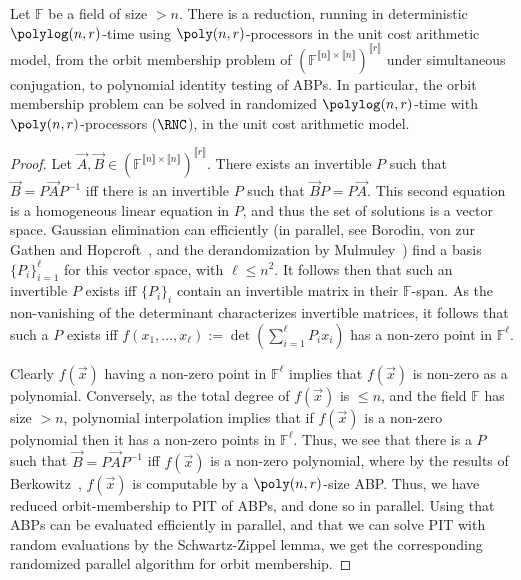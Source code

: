 \documentclass[letterpaper,11pt]{article}
\numberwithin{equation}{section}
\theoremstyle{plain}
\theoremstyle{remark}
\newcommand{\zr}[1]{{\llbracket {#1}\rrbracket}}
\newcommand{\F}{\mathbb{F}}
\newcommand{\eqdef}{:=}
\begin{document}
\begin{theorem}
	\label{orbitmembership}
	Let $\F$ be a field of size $>n$. There is a reduction, running in deterministic $\polylog(n,r)$-time using $\poly(n,r)$-processors in the unit cost arithmetic model, from the orbit membership problem of $(\F^{\zr{n}\times \zr{n}})^{\zr{r}}$ under simultaneous conjugation, to polynomial identity testing of ABPs.  In particular, the orbit membership problem can be solved in randomized $\polylog(n,r)$-time with $\poly(n,r)$-processors ($\RNC$), in the unit cost arithmetic model.
\end{theorem}
\begin{proof}
	Let $\vec{A},\vec{B}\in(\F^{\zr{n}\times\zr{n}})^{\zr{r}}$. There exists an invertible $P$ such that $\vec{B}=P\vec{A}P^{-1}$ iff there is an invertible $P$ such that $\vec{B}P=P\vec{A}$.  This second equation is a homogeneous linear equation in $P$, and thus the set of solutions is a vector space. Gaussian elimination can efficiently (in parallel, see Borodin, von zur Gathen and Hopcroft~\cite{BorodinGH82}, and the derandomization by Mulmuley~\cite{Mulmuley87}) find a basis $\{P_i\}_{i=1}^\ell$ for this vector space, with $\ell\le n^2$.  It follows then that such an invertible $P$ exists iff $\{P_i\}_i$ contain an invertible matrix in their $\F$-span.  As the non-vanishing of the determinant characterizes invertible matrices, it follows that such a $P$ exists iff $f(x_1,\ldots,x_\ell)\eqdef\det(\sum_{i=1}^\ell P_i x_i)$ has a non-zero point in $\F^\ell$.

	Clearly $f(\vec{x})$ having a non-zero point in $\F^\ell$ implies that $f(\vec{x})$ is non-zero as a polynomial. Conversely, as the total degree of $f(\vec{x})$ is $\le n$, and the field $\F$ has size $>n$, polynomial interpolation implies that if $f(\vec{x})$ is a non-zero polynomial then it has a non-zero points in $\F^\ell$. Thus, we see that there is a $P$ such that $\vec{B}=P\vec{A}P^{-1}$ iff $f(\vec{x})$ is a non-zero polynomial, where by the results of Berkowitz~\cite{Berkowitz84}, $f(\vec{x})$ is computable by a $\poly(n,r)$-size ABP.  Thus, we have reduced orbit-membership to PIT of ABPs, and done so in parallel.  Using that ABPs can be evaluated efficiently in parallel, and that we can solve PIT with random evaluations by the Schwartz-Zippel lemma, we get the corresponding randomized parallel algorithm for orbit membership.
\end{proof}
\end{document}
